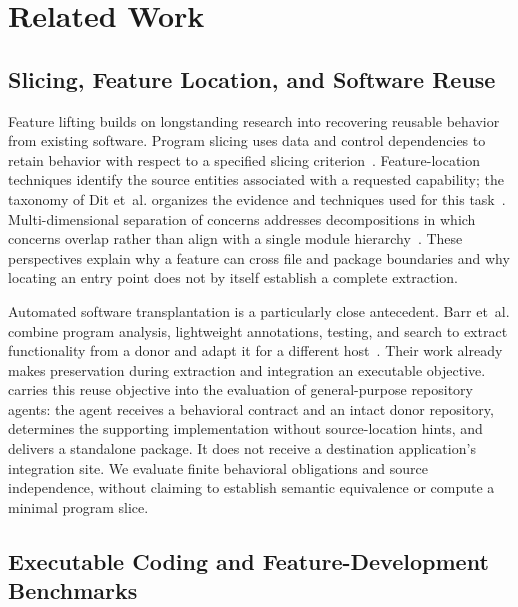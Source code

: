 \section{Related Work}
\label{sec:related-work}

\subsection{Slicing, Feature Location, and Software Reuse}

Feature lifting builds on longstanding research into recovering reusable behavior
from existing software. Program slicing uses data and control dependencies to
retain behavior with respect to a specified slicing
criterion~\cite{weiser1984slicing}. Feature-location techniques identify the source
entities associated with a requested capability; the taxonomy of Dit et~al.
organizes the evidence and techniques used for this
task~\cite{dit2013featurelocation}. Multi-dimensional separation of concerns
addresses decompositions in which concerns overlap rather than align with a
single module hierarchy~\cite{tarr1999degrees}. These perspectives explain why a
feature can cross file and package boundaries and why locating an entry point
does not by itself establish a complete extraction.

Automated software transplantation is a particularly close antecedent. Barr
et~al. combine program analysis, lightweight annotations, testing, and search to
extract functionality from a donor and adapt it for a different
host~\cite{barr2015transplantation}. Their work already makes preservation during
extraction and integration an executable objective. \flb carries this reuse
objective into the evaluation of general-purpose repository agents: the agent
receives a behavioral contract and an intact donor repository, determines the
supporting implementation without source-location hints, and delivers a standalone
package. It does not receive a destination application's integration site. We
evaluate finite behavioral obligations and source independence, without claiming
to establish semantic equivalence or compute a minimal program slice.

\subsection{Executable Coding and Feature-Development Benchmarks}

